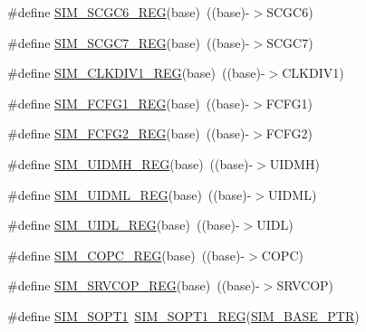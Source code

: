 \begin{DoxyCompactItemize}
\item 
\#define \hyperlink{group___s_i_m___register___accessor___macros_ga575def69d6a2257a1b2014c3c2fcae54}{S\+I\+M\+\_\+\+S\+C\+G\+C6\+\_\+\+R\+EG}(base)~((base)-\/$>$S\+C\+G\+C6)
\item 
\#define \hyperlink{group___s_i_m___register___accessor___macros_gace178bd787df5cdde63669fb795a84d5}{S\+I\+M\+\_\+\+S\+C\+G\+C7\+\_\+\+R\+EG}(base)~((base)-\/$>$S\+C\+G\+C7)
\item 
\#define \hyperlink{group___s_i_m___register___accessor___macros_gaa05276138d6ba426d9977f62fa12d659}{S\+I\+M\+\_\+\+C\+L\+K\+D\+I\+V1\+\_\+\+R\+EG}(base)~((base)-\/$>$C\+L\+K\+D\+I\+V1)
\item 
\#define \hyperlink{group___s_i_m___register___accessor___macros_gaa218fdd61f5d04088d7fa1cbec4ba9a9}{S\+I\+M\+\_\+\+F\+C\+F\+G1\+\_\+\+R\+EG}(base)~((base)-\/$>$F\+C\+F\+G1)
\item 
\#define \hyperlink{group___s_i_m___register___accessor___macros_ga28d588cd36812f942a01c0ee0ad1beb0}{S\+I\+M\+\_\+\+F\+C\+F\+G2\+\_\+\+R\+EG}(base)~((base)-\/$>$F\+C\+F\+G2)
\item 
\#define \hyperlink{group___s_i_m___register___accessor___macros_ga1f5eac1bbac9b6798958b4697632ef21}{S\+I\+M\+\_\+\+U\+I\+D\+M\+H\+\_\+\+R\+EG}(base)~((base)-\/$>$U\+I\+D\+MH)
\item 
\#define \hyperlink{group___s_i_m___register___accessor___macros_ga7c4e741241b9fc954f2cd568d29b6b45}{S\+I\+M\+\_\+\+U\+I\+D\+M\+L\+\_\+\+R\+EG}(base)~((base)-\/$>$U\+I\+D\+ML)
\item 
\#define \hyperlink{group___s_i_m___register___accessor___macros_gac4adca94e35e9cb122f6e0f80510708f}{S\+I\+M\+\_\+\+U\+I\+D\+L\+\_\+\+R\+EG}(base)~((base)-\/$>$U\+I\+DL)
\item 
\#define \hyperlink{group___s_i_m___register___accessor___macros_ga24b7bb2caf49ac6a5bea962ae761d371}{S\+I\+M\+\_\+\+C\+O\+P\+C\+\_\+\+R\+EG}(base)~((base)-\/$>$C\+O\+PC)
\item 
\#define \hyperlink{group___s_i_m___register___accessor___macros_gaf4814908256050a2818ca29f249545c2}{S\+I\+M\+\_\+\+S\+R\+V\+C\+O\+P\+\_\+\+R\+EG}(base)~((base)-\/$>$S\+R\+V\+C\+OP)
\item 
\#define \hyperlink{group___s_i_m___register___accessor___macros_ga2a1bceb27d0e81b2821f1f4f32a57c12}{S\+I\+M\+\_\+\+S\+O\+P\+T1}~\hyperlink{group___s_i_m___register___accessor___macros_ga3b7afc5db335a5be8aaa37f7fbecff72}{S\+I\+M\+\_\+\+S\+O\+P\+T1\+\_\+\+R\+EG}(\hyperlink{group___s_i_m___peripheral_ga719ec5df95fbb5732438f794f2cccf3c}{S\+I\+M\+\_\+\+B\+A\+S\+E\+\_\+\+P\+TR})

\end{DoxyCompactItemize}
